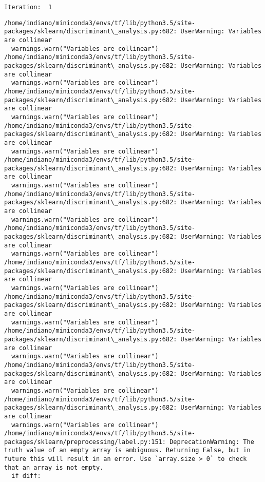 \documentclass[11pt]{article}
\begin{document}
    \begin{Verbatim}[commandchars=\\\{\}]
Iteration:  1

    \end{Verbatim}

    \begin{Verbatim}[commandchars=\\\{\}]
/home/indiano/miniconda3/envs/tf/lib/python3.5/site-packages/sklearn/discriminant\_analysis.py:682: UserWarning: Variables are collinear
  warnings.warn("Variables are collinear")
/home/indiano/miniconda3/envs/tf/lib/python3.5/site-packages/sklearn/discriminant\_analysis.py:682: UserWarning: Variables are collinear
  warnings.warn("Variables are collinear")
/home/indiano/miniconda3/envs/tf/lib/python3.5/site-packages/sklearn/discriminant\_analysis.py:682: UserWarning: Variables are collinear
  warnings.warn("Variables are collinear")
/home/indiano/miniconda3/envs/tf/lib/python3.5/site-packages/sklearn/discriminant\_analysis.py:682: UserWarning: Variables are collinear
  warnings.warn("Variables are collinear")
/home/indiano/miniconda3/envs/tf/lib/python3.5/site-packages/sklearn/discriminant\_analysis.py:682: UserWarning: Variables are collinear
  warnings.warn("Variables are collinear")
/home/indiano/miniconda3/envs/tf/lib/python3.5/site-packages/sklearn/discriminant\_analysis.py:682: UserWarning: Variables are collinear
  warnings.warn("Variables are collinear")
/home/indiano/miniconda3/envs/tf/lib/python3.5/site-packages/sklearn/discriminant\_analysis.py:682: UserWarning: Variables are collinear
  warnings.warn("Variables are collinear")
/home/indiano/miniconda3/envs/tf/lib/python3.5/site-packages/sklearn/discriminant\_analysis.py:682: UserWarning: Variables are collinear
  warnings.warn("Variables are collinear")
/home/indiano/miniconda3/envs/tf/lib/python3.5/site-packages/sklearn/discriminant\_analysis.py:682: UserWarning: Variables are collinear
  warnings.warn("Variables are collinear")
/home/indiano/miniconda3/envs/tf/lib/python3.5/site-packages/sklearn/discriminant\_analysis.py:682: UserWarning: Variables are collinear
  warnings.warn("Variables are collinear")
/home/indiano/miniconda3/envs/tf/lib/python3.5/site-packages/sklearn/discriminant\_analysis.py:682: UserWarning: Variables are collinear
  warnings.warn("Variables are collinear")
/home/indiano/miniconda3/envs/tf/lib/python3.5/site-packages/sklearn/discriminant\_analysis.py:682: UserWarning: Variables are collinear
  warnings.warn("Variables are collinear")
/home/indiano/miniconda3/envs/tf/lib/python3.5/site-packages/sklearn/preprocessing/label.py:151: DeprecationWarning: The truth value of an empty array is ambiguous. Returning False, but in future this will result in an error. Use `array.size > 0` to check that an array is not empty.
  if diff:

    \end{Verbatim}
\end{document}
